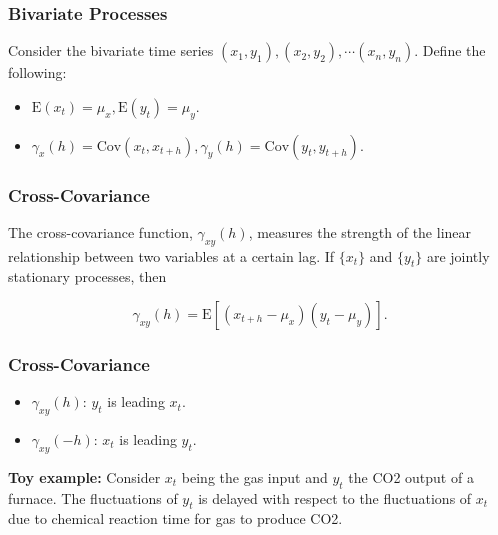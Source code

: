 \documentclass[%
xcolor=pdftex]{beamer}
\begin{document}






\begin{frame}
\frametitle{Bivariate Processes}

Consider the bivariate time series $(x_1,y_1), (x_2, y_2), \cdots (x_n, y_n)$. Define the following:

\begin{itemize}
\item $\mbox{E}(x_t) = \mu_x, \mbox{E}(y_t) = \mu_y$.
\item $\gamma_x (h) = \mbox{Cov}(x_t, x_{t+h}), \gamma_y (h) = \mbox{Cov}(y_t, y_{t+h})$.
\end{itemize}

\end{frame}

\begin{frame}
\frametitle{Cross-Covariance}

The cross-covariance function, $\gamma_{xy}(h)$, measures the strength of the linear relationship between two variables at a certain lag. If $\{x_t\}$ and $\{y_t\}$ are jointly stationary processes, then

\begin{equation} \label{eq:cov}
\gamma_{xy}(h) = \mbox{E}\left[ (x_{t+h} - \mu_x) (y_{t} - \mu_y) \right].
\end{equation}



\end{frame}






\begin{frame}
\frametitle{Cross-Covariance}

\begin{itemize}
\item $\gamma_{xy}(h)$: $y_t$ is leading $x_t$.
\item $\gamma_{xy}(-h)$: $x_t$ is leading $y_t$.
\end{itemize}

\vspace{5mm}

\textbf{Toy example:} Consider $x_t$ being the gas input and $y_t$ the CO2 output of a furnace. The fluctuations of $y_t$ is delayed with respect to the fluctuations of $x_t$ due to chemical reaction time for gas to produce CO2.

\end{frame}
\end{document}
